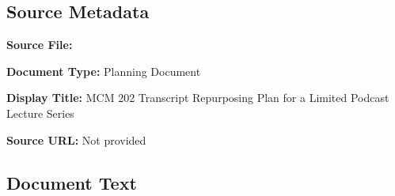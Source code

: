 \subsection*{Source Metadata}
\noindent\textbf{Source File:} \par
\noindent\textbf{Document Type:} Planning Document\par
\noindent\textbf{Display Title:} MCM 202 Transcript Repurposing Plan for a Limited Podcast Lecture Series\par
\noindent\textbf{Source URL:} Not provided\par

\subsection*{Document Text}
